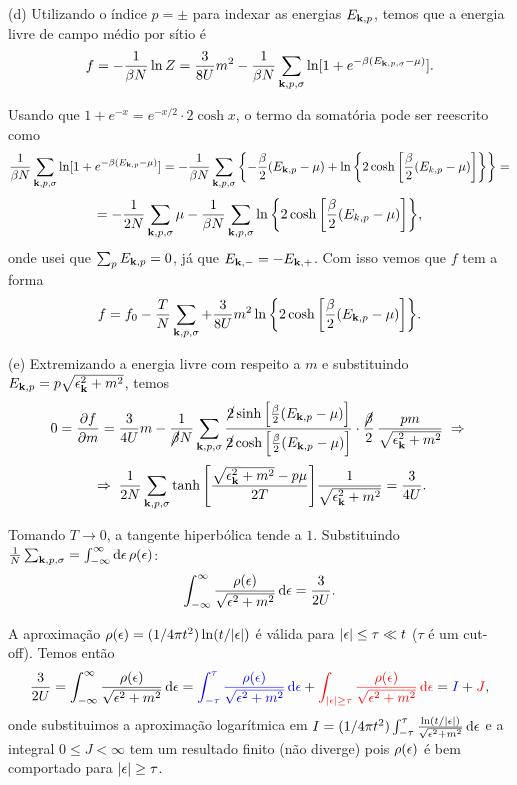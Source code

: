 \documentclass[a4paper,10pt]{article}
\begin{document}
\n

(d) Utilizando o índice $p = \pm$ para indexar as energias $E_{\vb{k},p}$, temos que a energia livre de campo médio por sítio é
$$
f = - \frac{1}{\beta N} \ln Z = \frac{3}{8U}m^2 -
\frac{1}{\beta N} \sum_{\vb{k}, p, \sigma} \ln[ 1 + e^{-\beta (E_{\vb{k},p,\sigma} - \mu)} ].
$$

Usando que $1 + e^{-x} = e^{-x/2} \cdot 2 \cosh x$, o termo da somatória pode ser reescrito como
$$
\frac{1}{\beta N} \sum_{\vb{k}, p, \sigma} \ln[ 1 + e^{-\beta (E_{\vb{k},p} - \mu)} ] =
-\frac{1}{\beta N} \sum_{\vb{k}, p, \sigma} \qty{
-\frac{\beta}{2} (E_{\vb{k},p} - \mu) +
\ln\qty{2 \cosh\qty[\frac{\beta}{2} (E_{k,p} - \mu)] }
} =
$$
$$
=
-\frac{1}{2 N} \sum_{\vb{k}, p, \sigma} \mu -
\frac{1}{\beta N} \sum_{\vb{k}, p, \sigma}
\ln\qty{2 \cosh\qty[\frac{\beta}{2} (E_{k,p} - \mu)] },
$$
onde usei que $\sum_{p} E_{\vb{k},p} = 0$, já que $E_{\vb{k},-} = - E_{\vb{k},+}$. Com isso vemos que $f$ tem a forma
$$
f = f_0 -
\frac{T}{N} \sum_{\vb{k},p,\sigma}
+ \frac{3}{8U} m^2
\ln\qty{2\cosh\qty[\frac{\beta}{2}(E_{\vb{k},p} - \mu)]} .
$$

(e) Extremizando a energia livre com respeito a $m$ e substituindo $E_{\vb{k},p} = p \sqrt{\epsilon_{\vb{k}}^2 + m^2}$, temos
$$
0 = \pdv{f}{m} =
\frac{3}{4U} m -
\frac{1}{\cancel{\beta} N} \sum_{\vb{k}, p, \sigma}
\frac{\cancel{2}\sinh\qty[\frac{\beta}{2}(E_{\vb{k},p}-\mu)]}{\cancel{2}\cosh\qty[\frac{\beta}{2}(E_{\vb{k},p}-\mu)]} \cdot
\frac{\cancel{\beta}}{2} \, \frac{p m}{\sqrt{\epsilon_{\vb{k}}^2 + m^2}} \; \Rightarrow \;
$$
$$
\; \Rightarrow \; \frac{1}{2N} \sum_{\vb{k}, p, \sigma}
\tanh\qty[\frac{\sqrt{\epsilon_{\vb{k}}^2 + m^2} - p\mu}{2T}]
\frac{1}{\sqrt{\epsilon_{\vb{k}}^2 + m^2}} = \frac{3}{4U} .
$$

Tomando $T \to 0$, a tangente hiperbólica tende a $1$. Substituindo $\frac{1}{N} \sum_{\vb{k},p,\sigma} = \int_{-\infty}^{\infty} \dd{\epsilon} \rho(\epsilon)$:
$$
\int_{-\infty}^{\infty} \frac{\rho(\epsilon)}{\sqrt{\epsilon^2 + m^2}} \dd{\epsilon} = \frac{3}{2U}.
$$

A aproximação $\rho(\epsilon) = (1/4\pi t^2) \ln(t/\abs{\epsilon})$ é válida para $\abs{\epsilon} \leq \tau \ll t$ ($\tau$ é um cut-off). Temos então
$$
\frac{3}{2U} = \int_{-\infty}^{\infty} \frac{\rho(\epsilon)}{\sqrt{\epsilon^2 + m^2}} \dd{\epsilon} =
\textcolor{blue}{\int_{-\tau}^{\tau} \frac{\rho(\epsilon)}{\sqrt{\epsilon^2 + m^2}} \dd{\epsilon}} +
\textcolor{red}{\int_{\abs{\epsilon} \geq \tau} \frac{\rho(\epsilon)}{\sqrt{\epsilon^2 + m^2}} \dd{\epsilon}} =
\textcolor{blue}{I} + \textcolor{red}{J},
$$
onde substituimos a aproximação logarítmica em $I = (1/4\pi t^2) \int_{-\tau}^{\tau} \frac{\ln(t/\abs{\epsilon})}{\sqrt{\epsilon^2 + m^2}} \dd{\epsilon}$ e a integral $0 \leq J < \infty$ tem um resultado finito (não diverge) pois $\rho(\epsilon)$ é bem comportado para $\abs{\epsilon} \geq \tau$.
\end{document}
